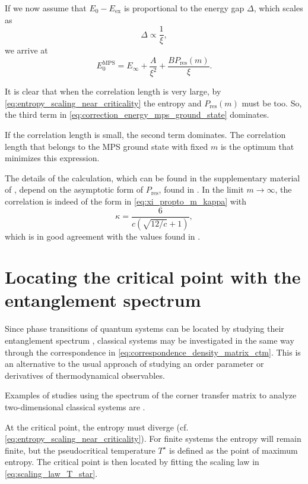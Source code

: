 If we now assume that $E_0 - E_{\text{ex}}$ is proportional to the energy gap $\Delta$, which scales as \cite{lieb1961two, mata1989energy, pfeuty1970one}
\begin{equation}
  \Delta \propto \frac{1}{\xi},
\end{equation}
we arrive at
\begin{equation}\label{eq:correction_energy_mps_ground_state}
  E_{0}^{\text{MPS}} = E_{\infty} + \frac{A}{\xi^2} + \frac{B P_{\text{res}}(m)}{\xi}.
\end{equation}

It is clear that when the correlation length is very large, by \autoref{eq:entropy_scaling_near_criticality} the entropy
and $P_{\text{res}}(m)$ must be too.
So, the third term in \autoref{eq:correction_energy_mps_ground_state} dominates.

If the correlation length is small, the second term dominates.
The correlation length that belongs to the MPS ground state with fixed $m$ is the optimum that minimizes this
expression.

The details of the calculation, which can be found in the supplementary material of \cite{pollmann2009theory},
depend on the asymptotic form of $P_{\text{res}}$, found in \cite{calabrese2008entanglement}. In the limit $m \to \infty$, the correlation is indeed of the form in \autoref{eq:xi_propto_m_kappa} with
\begin{equation}\label{eq:exact_value_kappa}
  \kappa = \frac{6}{c \left( \sqrt{12/c} + 1 \right) },
\end{equation}
which is in good agreement with the values found in \cite{tagliacozzo2008scaling}.


\section{Locating the critical point with the entanglement spectrum}\label{sec:locating_critical_point_entanglement}
Since phase transitions of quantum systems can be located by studying their entanglement spectrum
\cite{huang2017holographic, osborne2002entanglement}, classical systems may be investigated in the same way through the
correspondence in \autoref{eq:correspondence_density_matrix_ctm}.
This is an alternative to the usual approach of studying an order parameter or derivatives of thermodynamical
observables.

Examples of studies using the spectrum of the corner transfer matrix to analyze two-dimensional classical systems are
\cite{krvcmar2015reentrant, PhysRevE.94.022134, krvcmar2016phase}.

At the critical point, the entropy must diverge (cf.
\autoref{eq:entropy_scaling_near_criticality}).
For finite systems the entropy will remain finite, but the pseudocritical temperature $T^{\star}$ is defined as the
point of maximum entropy.
The critical point is then located by fitting the scaling law in \autoref{eq:scaling_law_T_star}.
